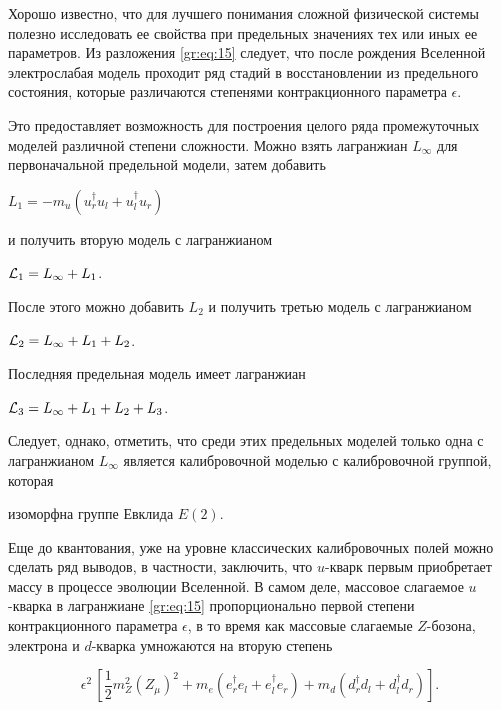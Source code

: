 Хорошо известно, что для лучшего понимания сложной физической системы полезно исследовать ее свойства при предельных значениях тех или иных ее параметров. Из разложения \eqref{gr:eq:15} следует, что после рождения Вселенной электрослабая модель проходит ряд стадий в  восстановлении из предельного состояния, которые различаются степенями контракционного параметра $ \epsilon $. 

Это предоставляет возможность для построения целого ряда промежуточных  моделей различной степени сложности. Можно взять лагранжиан $L_{\infty}$ для первоначальной предельной модели, затем добавить

$L_1=-m_u(u_r^{\dagger}u_{l} + u_{l}^{\dagger}u_r) $

и получить вторую модель с лагранжианом

${\cal L}_1=L_{\infty} +  L_1 $.

После этого можно добавить $ L_2 $ и получить третью  модель с лагранжианом

${\cal L}_2=L_{\infty} + L_1 +  L_2 $.

Последняя предельная модель имеет лагранжиан

${\cal L}_3=L_{\infty} +  L_1 + L_2 + L_3 $.

Следует, однако, отметить, что среди этих предельных моделей только одна с лагранжианом $L_{\infty}$ является калибровочной моделью с калибровочной группой, которая 

  изоморфна группе Евклида $E(2)$. 











Еще до квантования, уже на уровне классических калибровочных полей можно сделать ряд выводов, в частности, заключить, что $u$-кварк первым приобретает массу в процессе эволюции Вселенной. В самом деле, массовое слагаемое $u$-кварка в лагранжиане \eqref{gr:eq:15} пропорционально первой степени контракционного параметра $\epsilon $, в то время как массовые слагаемые $Z$-бозона, электрона и $d$-кварка умножаются на вторую степень 

\begin{equation}

\epsilon^2\, \left[\frac{1}{2}m_Z^2\left(Z_\mu\right)^2 + m_e(e_r^{\dagger}e_l + e_l^{\dagger} e_r)+

 m_d(d_r^{\dagger}d_{l} + d_{l}^{\dagger}d_r)\right]. %

\label{gr:eq:40}

\end{equation}

